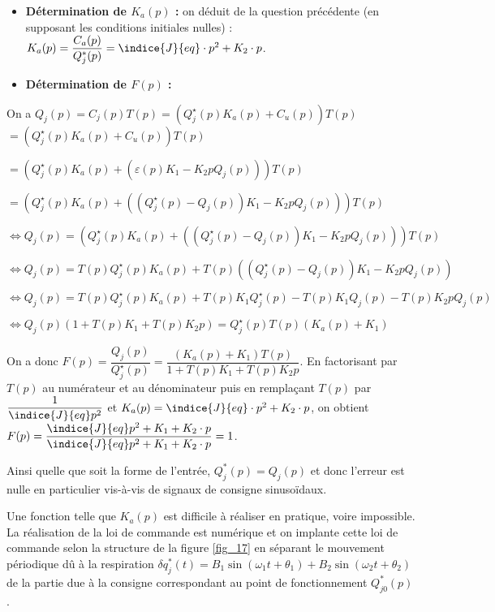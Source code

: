 \begin{corrige}
\begin{itemize}
\item \textbf{Détermination de $K_a(p)$ :} on déduit de la question précédente (en supposant les conditions initiales nulles) : $K_a(p)=\dfrac{C_a(p)}{Q^*_j(p)}=\indice{J}{eq}\cdot p^2+K_2\cdot p$.
\item \textbf{Détermination de $F(p)$ :}
\end{itemize}

On a $Q_j(p) = C_j(p) T(p)= \left( Q_j^{\star}(p) K_a(p) + C_u(p) \right) T(p)$
$= \left( Q_j^{\star}(p) K_a(p) + C_u(p) \right) T(p)$

$= \left( Q_j^{\star}(p) K_a(p) + \left( \varepsilon(p) K_1 - K_2 p Q_j(p) \right)\right) T(p)$

$= \left( Q_j^{\star}(p) K_a(p) + \left( \left(Q_j^{\star}(p) - Q_j(p) \right) K_1 - K_2 p Q_j(p) \right)\right) T(p)$


$\Leftrightarrow Q_j(p) = 
\left(
    Q_j^{\star}(p) K_a(p) + 
    \left( 
        \left(Q_j^{\star}(p) - Q_j(p) \right) K_1 - K_2 p Q_j(p) 
    \right)
\right) T(p)$

$\Leftrightarrow Q_j(p) = 
    T(p)Q_j^{\star}(p) K_a(p) + 
    T(p)\left( 
        \left(Q_j^{\star}(p) - Q_j(p) \right) K_1 - K_2 p Q_j(p) 
    \right) $

$\Leftrightarrow Q_j(p) = 
    T(p)Q_j^{\star}(p) K_a(p) + 
        T(p)K_1 Q_j^{\star}(p) -T(p)K_1  Q_j(p)   - T(p)K_2 p Q_j(p) 
     $

$\Leftrightarrow Q_j(p)\left(1     +T(p)K_1     + T(p)K_2 p\right)= 
      Q_j^{\star}(p)T(p) \left(  K_a(p)     +K_1 \right)     $

On a donc $F(p)=\dfrac{Q_j(p)}{Q_j^{\star}(p)}=\dfrac{\left(K_a(p) +K_1\right)T(p)}{1+T(p)K_1 + T(p)K_2 p}$.
En factorisant par $T(p)$ au numérateur et au dénominateur puis en remplaçant $T(p)$ par $\dfrac{1}{\indice{J}{eq}p^2}$ et $K_a(p)=\indice{J}{eq}\cdot p^2+K_2\cdot p$, on obtient $
F(p)=\dfrac{\indice{J}{eq}p^2+K_1+K_2\cdot p}{\indice{J}{eq}p^2+K_1+K_2\cdot p}=1
$.

Ainsi quelle que soit la forme de l'entrée, $Q^*_j(p)=Q_j(p)$ et donc l'erreur est nulle en particulier vis-à-vis de signaux de consigne sinusoïdaux.
\end{corrige}
\else
\fi

Une fonction telle que $K_{a}(p)$ est difficile à réaliser en pratique, voire impossible. La réalisation de la loi de commande est numérique et on implante cette loi de commande selon la structure de la figure \ref{fig_17} en séparant le mouvement périodique dû à la respiration $\delta q_{j}^{*}(t)=B_{1} \sin \left(\omega_{1} t+\theta_{1}\right)+B_{2} \sin \left(\omega_{2} t+\theta_{2}\right)$ de la partie due à la consigne correspondant au point de fonctionnement $Q_{j 0}^{*}(p)$.


